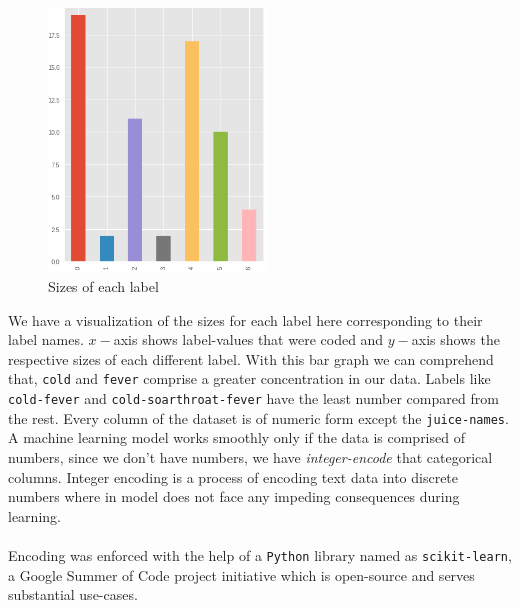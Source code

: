 \documentclass[letterpaper, 11pt]{article}
\begin{document}
\begin{figure}
\begin{center}
\includegraphics[width=58mm,scale=3]{sizez.png}
\caption{Sizes of each label}
\end{center}
\end{figure}

We have a visualization of the sizes for each label here corresponding to their label names. $x-$axis shows label-values that were coded and $y-$axis shows the respective sizes of each different label. With this bar graph we can comprehend that, \texttt{cold} and \texttt{fever} comprise a greater concentration in our data. Labels like \texttt{cold-fever} and \texttt{cold-soarthroat-fever} have the least number compared from the rest. Every column of the dataset is of numeric form except the \texttt{juice-names}. A machine learning model works smoothly only if the data is comprised of numbers, since we don't have numbers, we have \textit{integer-encode} that categorical columns. Integer encoding is a process of encoding text data into discrete numbers where in model does not face any impeding consequences during learning.
\paragraph{} Encoding was enforced with the help of a \texttt{Python} library named as \texttt{scikit-learn}, a Google Summer of Code project initiative which is open-source and serves substantial use-cases.
\end{document}
